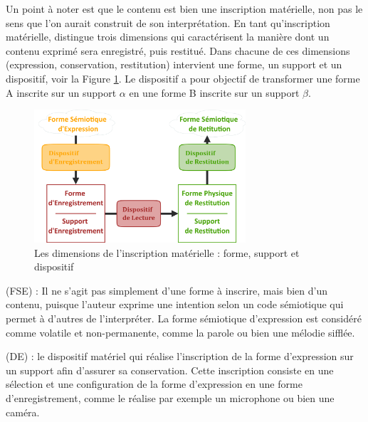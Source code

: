 Un point à noter est que le contenu est bien une inscription matérielle, non pas le sens que l'on aurait construit de son interprétation.
En tant qu'inscription matérielle, \citeauthor{bachimont:icc} distingue trois dimensions qui caractérisent la manière dont un contenu exprimé sera enregistré, puis restitué.
Dans chacune de ces dimensions (expression, conservation, restitution) intervient une forme, un support et un dispositif, voir la Figure \ref{img:inscriptions}.
Le dispositif a pour objectif de transformer une forme A inscrite sur un support $\alpha$ en une forme B inscrite sur un support $\beta$.

\begin{figure}[ht!]
\centering
\includegraphics[width=0.7\textwidth]{images/DimensionsInscriptions-v2.png}
\caption{Les dimensions de l'inscription matérielle : forme, support et dispositif}
\label{img:inscriptions}
\end{figure}


	\begin{liste}
		\item {} (FSE) : Il ne s'agit pas simplement d'une forme à inscrire, mais bien d'un contenu, puisque l'auteur exprime une intention selon un code sémiotique qui permet à d'autres de l'interpréter.
		La forme sémiotique d'expression est considéré comme volatile et non-permanente, comme la parole ou bien une mélodie sifflée.

		\item {} (DE) : le dispositif matériel qui réalise l'inscription de la forme d'expression sur un support afin d'assurer sa conservation.
		Cette inscription consiste en une sélection et une configuration de la forme d'expression en une forme d'enregistrement, comme le réalise par exemple un microphone ou bien une caméra.
	\end{liste}

